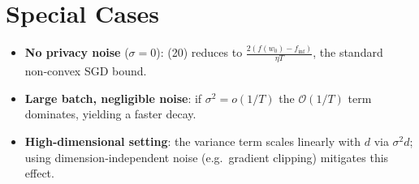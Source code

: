 \documentclass[11pt]{article}
\begin{document}
\section*{Special Cases}
\begin{itemize}
\item \textbf{No privacy noise} ($\sigma=0$): (20) reduces to
$\frac{2(f(w_0)-f_{\inf})}{\eta T}$, the standard non‑convex SGD bound.
\item \textbf{Large batch, negligible noise}: if $\sigma^{2}=o(1/T)$ the
$\mathcal O(1/T)$ term dominates, yielding a faster decay.
\item \textbf{High‑dimensional setting}: the variance term scales linearly
with $d$ via $\sigma^{2}d$; using dimension‑independent noise (e.g.\
gradient clipping) mitigates this effect.
\end{itemize}
\end{document}
